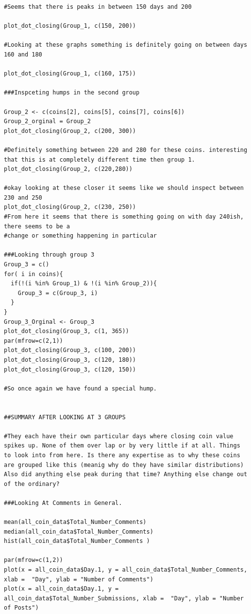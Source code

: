 \documentclass[12pt]{article}
\begin{document}
{\begin{verbatim}
#Seems that there is peaks in between 150 days and 200

plot_dot_closing(Group_1, c(150, 200))

#Looking at these graphs something is definitely going on between days 160 and 180

plot_dot_closing(Group_1, c(160, 175))

###Inspceting humps in the second group

Group_2 <- c(coins[2], coins[5], coins[7], coins[6])
Group_2_orginal = Group_2
plot_dot_closing(Group_2, c(200, 300))

#Definitely something between 220 and 280 for these coins. interesting that this is at completely different time then group 1.
plot_dot_closing(Group_2, c(220,280))

#okay looking at these closer it seems like we should inspect between 230 and 250
plot_dot_closing(Group_2, c(230, 250))
#From here it seems that there is something going on with day 240ish, there seems to be a 
#change or something happening in particular

###Looking through group 3
Group_3 = c()
for( i in coins){
  if(!(i %in% Group_1) & !(i %in% Group_2)){
    Group_3 = c(Group_3, i)
  }
}
Group_3_Orginal <- Group_3
plot_dot_closing(Group_3, c(1, 365))
par(mfrow=c(2,1))
plot_dot_closing(Group_3, c(100, 200))
plot_dot_closing(Group_3, c(120, 180))
plot_dot_closing(Group_3, c(120, 150))

#So once again we have found a special hump. 


##SUMMARY AFTER LOOKING AT 3 GROUPS

#They each have their own particular days where closing coin value spikes up. None of them over lap or by very little if at all. Things to look into from here. Is there any expertise as to why these coins are grouped like this (meanig why do they have similar distributions) Also did anything else peak during that time? Anything else change out of the ordinary?
  
###Looking At Comments in General.

mean(all_coin_data$Total_Number_Comments)
median(all_coin_data$Total_Number_Comments)
hist(all_coin_data$Total_Number_Comments )

par(mfrow=c(1,2))
plot(x = all_coin_data$Day.1, y = all_coin_data$Total_Number_Comments, xlab =  "Day", ylab = "Number of Comments")
plot(x = all_coin_data$Day.1, y = all_coin_data$Total_Number_Submissions, xlab =  "Day", ylab = "Number of Posts")


\end{verbatim}}
\end{document}
